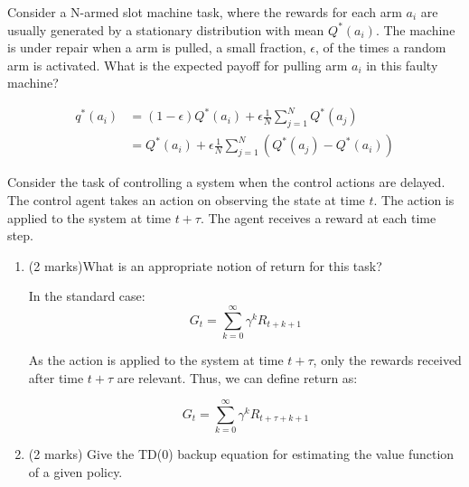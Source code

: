 \documentclass[addpoints,12pt,solution]{exam}
\begin{document}
    \begin{questions}

         Consider a N-armed slot machine task, where the rewards for
        each arm $a_i$ are usually generated by a stationary distribution with mean $Q^{*}(a_i)$. The machine is under repair when a arm is pulled, a small fraction, $\epsilon$, of the times a random arm is activated. What is the expected payoff for pulling arm $a_i$ in this faulty machine?

        \begin{solution}
            \begin{align*}
                q^*(a_i) & = (1-\epsilon) Q^*(a_i) + \epsilon \frac{1}{N} \sum_{j = 1}^{N} {Q^*(a_j)} \\
                & = Q^*(a_i) +  \epsilon \frac{1}{N} \sum_{j = 1}^{N} {(Q^*(a_j)-Q^*(a_i))}
            \end{align*}
        \end{solution}


         Consider the task of controlling a system when the control actions are delayed. The control agent takes an action on observing the state at time $t$. The action is applied to the system at time $t + \tau$. The agent
        receives a reward at each time step.
        \begin{enumerate}[label=(\alph*)]

            \item (2 marks)What is an appropriate notion of return for this task?

            \begin{solution}

                In the standard case:
                \[G_t = \sum_{k=0}^{\infty} \gamma^{k}R_{t + k + 1}\]

                As the action is applied to the system at time $t + \tau$, only the rewards received after time $t + \tau$ are relevant.
                Thus, we can define return as:

                \[G_t = \sum_{k=0}^{\infty} \gamma^{k}R_{t + \tau + k + 1}\]

            \end{solution}

            \item (2 marks) Give the TD(0) backup equation for estimating the value function of a given policy.


\end{enumerate}
\end{questions}
\end{document}
